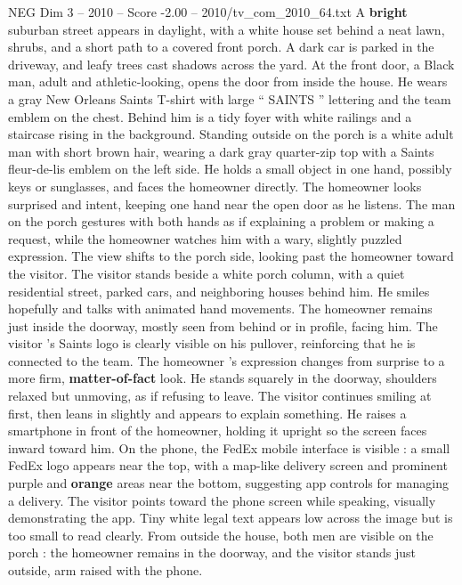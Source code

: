 \begin{textsample}{NEG Dim 3 – 2010 – Score -2.00 – 2010/tv\_com\_2010\_64.txt}  \label{ex:f3_neg_009}
A \textbf{bright} suburban street appears in daylight, with a white house set behind a neat lawn, shrubs, and a short path to a covered front porch.
A dark car is parked in the driveway, and leafy trees cast shadows across the yard.
At the front door, a Black man, adult and athletic-looking, opens the door from inside the house.
He wears a gray New Orleans Saints T-shirt with large “ SAINTS ” lettering and the team emblem on the chest.
Behind him is a tidy foyer with white railings and a staircase rising in the background.
Standing outside on the porch is a white adult man with short brown hair, wearing a dark gray quarter-zip top with a Saints fleur-de-lis emblem on the left side.
He holds a small object in one hand, possibly keys or sunglasses, and faces the homeowner directly.
The homeowner looks surprised and intent, keeping one hand near the open door as he listens.
The man on the porch gestures with both hands as if explaining a problem or making a request, while the homeowner watches him with a wary, slightly puzzled expression.
The view shifts to the porch side, looking past the homeowner toward the visitor.
The visitor stands beside a white porch column, with a quiet residential street, parked cars, and neighboring houses behind him.
He smiles hopefully and talks with animated hand movements.
The homeowner remains just inside the doorway, mostly seen from behind or in profile, facing him.
The visitor ’s Saints logo is clearly visible on his pullover, reinforcing that he is connected to the team.
The homeowner ’s expression changes from surprise to a more firm, \textbf{matter-of-fact} look.
He stands squarely in the doorway, shoulders relaxed but unmoving, as if refusing to leave.
The visitor continues smiling at first, then leans in slightly and appears to explain something.
He raises a smartphone in front of the homeowner, holding it upright so the screen faces inward toward him.
On the phone, the FedEx mobile interface is visible : a small FedEx logo appears near the top, with a map-like delivery screen and prominent purple and \textbf{orange} areas near the bottom, suggesting app controls for managing a delivery.
The visitor points toward the phone screen while speaking, visually demonstrating the app.
Tiny white legal text appears low across the image but is too small to read clearly.
From outside the house, both men are visible on the porch : the homeowner remains in the doorway, and the visitor stands just outside, arm raised with the phone.

\end{textsample}
